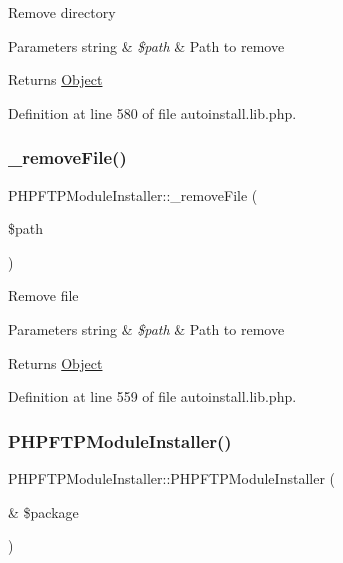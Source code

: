 Remove directory


\begin{DoxyParams}[1]{Parameters}
string & {\em \$path} & Path to remove \\
\hline
\end{DoxyParams}
\begin{DoxyReturn}{Returns}
\hyperlink{classObject}{Object} 
\end{DoxyReturn}


Definition at line 580 of file autoinstall.\+lib.\+php.

\hypertarget{classPHPFTPModuleInstaller_a6bfd41813d9f70b9e2ee06deb709742f}{}\label{classPHPFTPModuleInstaller_a6bfd41813d9f70b9e2ee06deb709742f} 
\subsubsection{\texorpdfstring{\+\_\+remove\+File()}{\_removeFile()}}
{\footnotesize\ttfamily P\+H\+P\+F\+T\+P\+Module\+Installer\+::\+\_\+remove\+File (\begin{DoxyParamCaption}\item[{}]{\$path }\end{DoxyParamCaption})}

Remove file


\begin{DoxyParams}[1]{Parameters}
string & {\em \$path} & Path to remove \\
\hline
\end{DoxyParams}
\begin{DoxyReturn}{Returns}
\hyperlink{classObject}{Object} 
\end{DoxyReturn}


Definition at line 559 of file autoinstall.\+lib.\+php.

\hypertarget{classPHPFTPModuleInstaller_a8bd8f79d6614af9e7d28ee497dc9eea1}{}\label{classPHPFTPModuleInstaller_a8bd8f79d6614af9e7d28ee497dc9eea1} 
\subsubsection{\texorpdfstring{P\+H\+P\+F\+T\+P\+Module\+Installer()}{PHPFTPModuleInstaller()}}
{\footnotesize\ttfamily P\+H\+P\+F\+T\+P\+Module\+Installer\+::\+P\+H\+P\+F\+T\+P\+Module\+Installer (\begin{DoxyParamCaption}\item[{\&}]{\$package }\end{DoxyParamCaption})}



